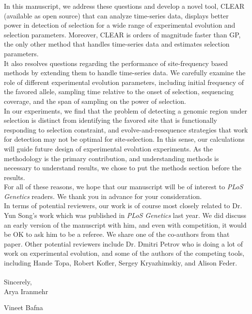 \documentclass[11pt]{article}
\begin{document}
In this manuscript, we address these questions and develop a novel tool, CLEAR 
(available as open source) that can analyze time-series data, displays better 
power in detection of selection for a wide range of experimental evolution and 
selection parameters. Moreover, CLEAR is orders of magnitude faster than GP, 
the only other method that handles time-series data and estimates selection 
parameters.\\

It also resolves questions regarding the performance of site-frequency based 
methods by extending them to handle time-series data. We carefully examine the 
role of different experimental evolution parameters, including initial 
frequency of the favored allele, sampling time relative to the onset of 
selection, sequencing coverage, and the span of sampling on the power of 
selection. \\

In our experiments, we find that the problem of detecting a genomic region 
under selection is distinct from identifying the favored site that is 
functionally responding to selection constraint, and evolve-and-resequence 
strategies that work for detection may not be optimal for site-selection. In 
this sense, our calculations will guide future design of experimental evolution 
experiments.  As the methodology is the primary contribution, and understanding 
methods is necessary to understand results, we chose to put the methods section 
before the results. \\

For all of these reasons, we hope that our manuscript will be of interest to 
\emph{PLoS Genetics} readers. We thank you in advance for your consideration.\\

In terms of potential reviewers, our work is of course most closely related to 
Dr. Yun Song’s work which was published in \emph{PLoS Genetics} last year. We 
did 
discuss an early version of the manuscript with him, and even with competition, 
it would be OK to ask him to be a referee. We share one of the co-authors from 
that paper. Other potential reviewers include Dr. Dmitri Petrov who is doing a 
lot of work on experimental evolution, and some of the authors of the competing 
tools, including Hande Topa, Robert Kofler, Sergey Kryazhimskiy, and Alison 
Feder.\\ \\

Sincerely,\\


Arya Iranmehr

Vineet Bafna
\end{document}
